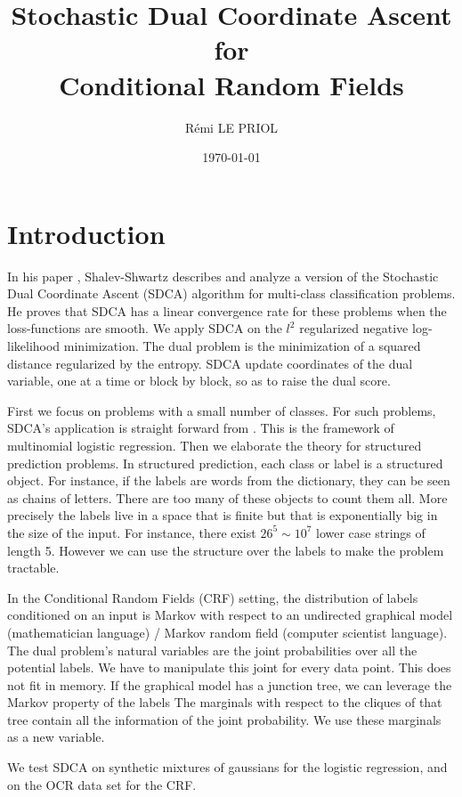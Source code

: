 \documentclass{article}
\title{Stochastic Dual Coordinate Ascent \\ for \\ Conditional Random Fields}
\author{R\'emi LE PRIOL}
\date{\today}
\DeclareMathOperator{\1}{\mathbb{1}}
\begin{document}
\maketitle

\section*{Introduction}
In his paper \cite{shalev-shwartz_accelerated_2013-1}, Shalev-Shwartz describes and analyze a version of the Stochastic Dual Coordinate Ascent (SDCA) algorithm for multi-class classification problems.
He proves that SDCA has a linear convergence rate for these problems when the loss-functions are smooth.
We apply SDCA on the $l^2$ regularized negative log-likelihood minimization. 
The dual problem is the minimization of a squared distance regularized by the entropy.
SDCA update coordinates of the dual variable, one at a time or block by block, so as to raise the dual score.
  
First we focus on problems with a small number of classes.
For such problems, SDCA's application is straight forward from \cite{shalev-shwartz_accelerated_2013-1}.
This is the framework of multinomial logistic regression.
Then we elaborate the theory for structured prediction problems.
In structured prediction, each class or label is a structured object.
For instance, if the labels are words from the dictionary, they can be seen as chains of letters.
There are too many of these objects to count them all.
More precisely  the labels live in a space that is finite but that is exponentially big in the size of the input.
For instance, there exist $26^5 \sim 10^7$ lower case strings of length 5. 
However we can use the structure over the labels to make the problem tractable.

In the Conditional Random Fields (CRF) setting, the distribution of labels conditioned on an input is Markov with respect to an undirected graphical model (mathematician language) / Markov random field (computer scientist language). 
The dual problem's natural variables are the joint probabilities over all the potential labels.
We have to manipulate this joint for every data point.
This does not fit in memory.
If the graphical model has a junction tree, we can leverage the Markov property of the labels
The marginals with respect to the cliques of that tree contain all the information of the joint probability.
We use these marginals as a new variable.

We test SDCA on synthetic mixtures of gaussians for the logistic regression, and on the OCR data set for the CRF.
\end{document}
